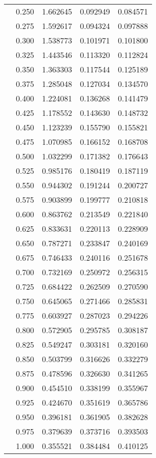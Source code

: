 \begin{tabular}{llrrr}
         & 0.250 &   1.662645 &   0.092949 &   0.084571 \\
         & 0.275 &   1.592617 &   0.094324 &   0.097888 \\
         & 0.300 &   1.538773 &   0.101971 &   0.101800 \\
         & 0.325 &   1.443546 &   0.113320 &   0.112824 \\
         & 0.350 &   1.363303 &   0.117544 &   0.125189 \\
         & 0.375 &   1.285048 &   0.127034 &   0.134570 \\
         & 0.400 &   1.224081 &   0.136268 &   0.141479 \\
         & 0.425 &   1.178552 &   0.143630 &   0.148732 \\
         & 0.450 &   1.123239 &   0.155790 &   0.155821 \\
         & 0.475 &   1.070985 &   0.166152 &   0.168708 \\
         & 0.500 &   1.032299 &   0.171382 &   0.176643 \\
         & 0.525 &   0.985176 &   0.180419 &   0.187119 \\
         & 0.550 &   0.944302 &   0.191244 &   0.200727 \\
         & 0.575 &   0.903899 &   0.199777 &   0.210818 \\
         & 0.600 &   0.863762 &   0.213549 &   0.221840 \\
         & 0.625 &   0.833631 &   0.220113 &   0.228909 \\
         & 0.650 &   0.787271 &   0.233847 &   0.240169 \\
         & 0.675 &   0.746433 &   0.240116 &   0.251678 \\
         & 0.700 &   0.732169 &   0.250972 &   0.256315 \\
         & 0.725 &   0.684422 &   0.262509 &   0.270590 \\
         & 0.750 &   0.645065 &   0.271466 &   0.285831 \\
         & 0.775 &   0.603927 &   0.287023 &   0.294226 \\
         & 0.800 &   0.572905 &   0.295785 &   0.308187 \\
         & 0.825 &   0.549247 &   0.303181 &   0.320160 \\
         & 0.850 &   0.503799 &   0.316626 &   0.332279 \\
         & 0.875 &   0.478596 &   0.326630 &   0.341265 \\
         & 0.900 &   0.454510 &   0.338199 &   0.355967 \\
         & 0.925 &   0.424670 &   0.351619 &   0.365786 \\
         & 0.950 &   0.396181 &   0.361905 &   0.382628 \\
         & 0.975 &   0.379639 &   0.373716 &   0.393503 \\
         & 1.000 &   0.355521 &   0.384484 &   0.410125 \\
\bottomrule
\end{tabular}
